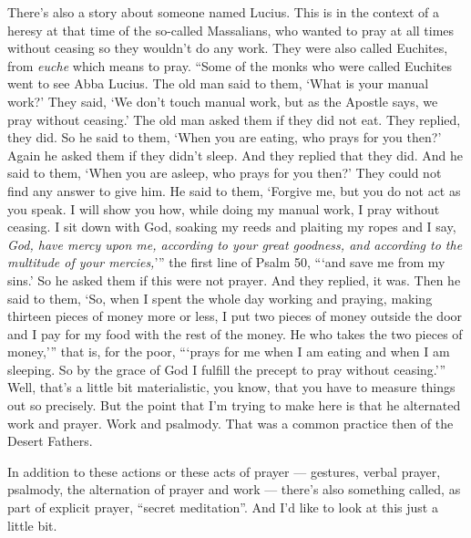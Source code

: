There's also a story about someone named Lucius. This is in the context of a heresy at that time of the so-called Massalians, who wanted to pray at all times without ceasing so they wouldn't do any work. They were also called Euchites, from \emph{euche} which means to pray. ``Some of the monks who were called Euchites went to see Abba Lucius. The old man said to them, `What is your manual work?' They said, `We don't touch manual work, but as the Apostle says, we pray without ceasing.' The old man asked them if they did not eat. They replied, they did. So he said to them, `When you are eating, who prays for you then?' Again he asked them if they didn't sleep. And they replied that they did. And he said to them, `When you are asleep, who prays for you then?' They could not find any answer to give him. He said to them, `Forgive me, but you do not act as you speak. I will show you how, while doing my manual work, I pray without ceasing. I sit down with God, soaking my reeds and plaiting my ropes and I say, \emph{God, have mercy upon me, according to your great goodness, and according to the multitude of your mercies,}''' the first line of Psalm 50, ```and save me from my sins.' So he asked them if this were not prayer. And they replied, it was. Then he said to them, `So, when I spent the whole day working and praying, making thirteen pieces of money more or less, I put two pieces of money outside the door and I pay for my food with the rest of the money. He who takes the two pieces of money,''' that is, for the poor, ```prays for me when I am eating and when I am sleeping. So by the grace of God I fulfill the precept to pray without ceasing.''' Well, that's a little bit materialistic, you know, that you have to measure things out so precisely. But the point that I'm trying to make here is that he alternated work and prayer. Work and psalmody. That was a common practice then of the Desert Fathers.

In addition to these actions or these acts of prayer --- gestures, verbal prayer, psalmody, the alternation of prayer and work --- there's also something called, as part of explicit prayer, ``secret meditation''. And I'd like to look at this just a little bit.

